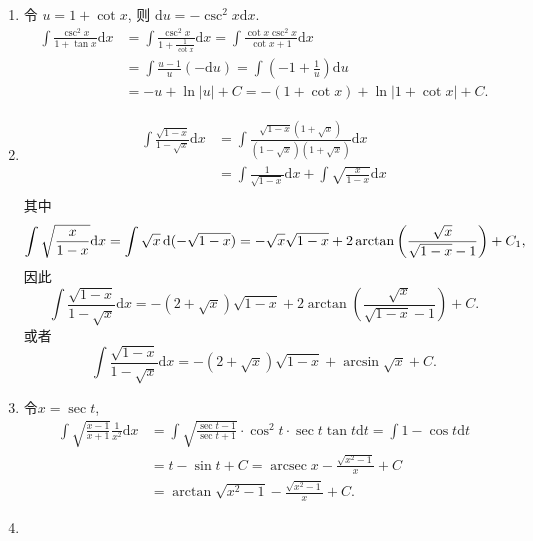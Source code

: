 \begin{solution}
\begin{enumerate}
        \item 令 $u = 1 + \cot x$, 则 $\mathrm{d}u = -\csc^2 x \mathrm{d}x$.
              \begin{align*}
                  \int \frac{\csc^2 x}{1 + \tan x} \mathrm{d}x & = \int \frac{\csc^2 x}{1 + \frac{1}{\cot x}} \mathrm{d}x = \int \frac{\cot x \csc^2 x}{\cot x + 1} \mathrm{d}x \\
                                                               & = \int \frac{u-1}{u} (-\mathrm{d}u) = \int \left(-1 + \frac{1}{u}\right) \mathrm{d}u                           \\
                                                               & = - u +  \ln|u| + C =- (1 + \cot x) + \ln|1 + \cot x| + C.
              \end{align*}

        \item \begin{align*}
                  \int \frac{\sqrt{1 - x}}{1 - \sqrt x} \mathrm{d}x & = \int \frac{\sqrt{1 - x}(1 + \sqrt x)}{(1 - \sqrt x)(1 + \sqrt x)} \mathrm{d}x   \\
                                                                    & = \int \frac{1}{\sqrt{1-x}} \mathrm{d}x + \int \sqrt{\frac{x}{1 - x}} \mathrm{d}x \\
              \end{align*}
              其中$$\int \sqrt{\frac{x}{1 - x}} \mathrm{d}x = \int \sqrt{x} \operatorname{d} (-\sqrt{1-x}) = -\sqrt{x} \sqrt{1-x} + 2 \arctan \left( \frac{\sqrt{x}}{\sqrt{1-x}-1} \right) + C_1,$$
              因此$$\int \frac{\sqrt{1 - x}}{1 - \sqrt x} \mathrm{d}x = - (2 + \sqrt{x}) \sqrt{1 - x} + 2 \arctan \left( \frac{\sqrt{x}}{\sqrt{1-x}-1} \right) + C.$$
              或者$$\int \frac{\sqrt{1 - x}}{1 - \sqrt x} \mathrm{d}x = - (2 + \sqrt{x}) \sqrt{1 - x} + \arcsin \sqrt{x} + C.$$
        \item 令$x = \sec t$,
        \begin{align*}
         \int \sqrt{\frac{x - 1}{x + 1}} \frac{1}{x^2} \mathrm{d}x & = \int \sqrt{\frac{\sec t - 1}{\sec t + 1}} \cdot \cos^2 t \cdot \sec t \tan t \mathrm{d}t = \int 1 - \cos t \mathrm{d}t \\
         & = t - \sin t + C = \operatorname{arcsec} x - \frac{\sqrt{x^2 - 1}}{x} + C \\
         & = \arctan \sqrt{x^2 - 1} - \frac{\sqrt{x^2 - 1}}{x} + C.
        \end{align*}
        \item \begin{align*}

\end{align*}
\end{enumerate}
\end{solution}
